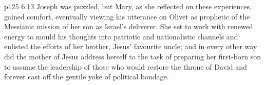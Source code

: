 \vs p125 6:13 \pc Joseph was puzzled, but Mary, as she reflected on these experiences, gained comfort, eventually viewing his utterance on Olivet as prophetic of the Messianic mission of her son as Israel’s deliverer. She set to work with renewed energy to mould his thoughts into patriotic and nationalistic channels and enlisted the efforts of her brother, Jesus’ favourite uncle; and in every other way did the mother of Jesus address herself to the task of preparing her first\hyp{}born son to assume the leadership of those who would restore the throne of David and forever cast off the gentile yoke of political bondage.
